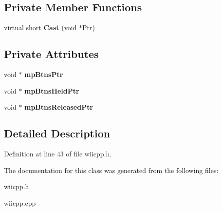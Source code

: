 \subsection*{\-Private \-Member \-Functions}
\begin{DoxyCompactItemize}
\item 
\hypertarget{class_c_button_base_aa2accc210e6c60b8d4aec8ea5ee4a9d8}{virtual short {\bfseries \-Cast} (void $\ast$\-Ptr)}\label{class_c_button_base_aa2accc210e6c60b8d4aec8ea5ee4a9d8}

\end{DoxyCompactItemize}
\subsection*{\-Private \-Attributes}
\begin{DoxyCompactItemize}
\item 
\hypertarget{class_c_button_base_ac15590c3755869ab95aac1716e2f83b7}{void $\ast$ {\bfseries mp\-Btns\-Ptr}}\label{class_c_button_base_ac15590c3755869ab95aac1716e2f83b7}

\item 
\hypertarget{class_c_button_base_ab8c2766f06261ea74a6d8ae3f7cf52dd}{void $\ast$ {\bfseries mp\-Btns\-Held\-Ptr}}\label{class_c_button_base_ab8c2766f06261ea74a6d8ae3f7cf52dd}

\item 
\hypertarget{class_c_button_base_a8d064f3dc6b97b1b53067e4f35bd6367}{void $\ast$ {\bfseries mp\-Btns\-Released\-Ptr}}\label{class_c_button_base_a8d064f3dc6b97b1b53067e4f35bd6367}

\end{DoxyCompactItemize}


\subsection{\-Detailed \-Description}


\-Definition at line 43 of file wiicpp.\-h.



\-The documentation for this class was generated from the following files\-:\begin{DoxyCompactItemize}
\item 
wiicpp.\-h\item 
wiicpp.\-cpp\end{DoxyCompactItemize}
